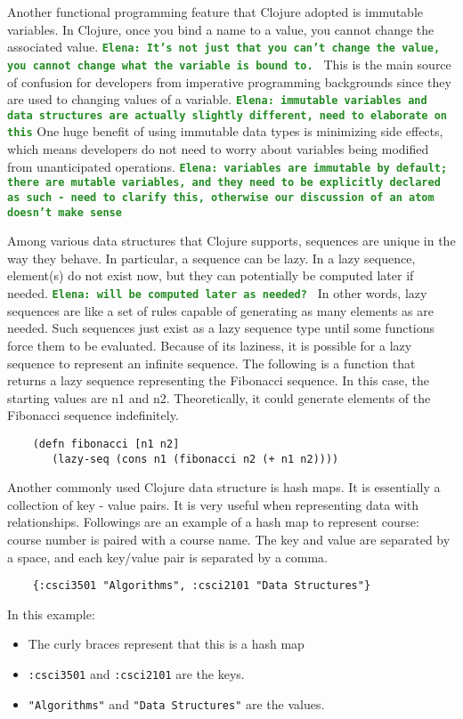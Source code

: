 \documentclass[12pt]{article}
\newcommand{\comment}[1]{{\bf \tt  {#1}}}
\newcommand{\emcomment}[1]{\textcolor{ForestGreen}{\comment{Elena: {#1}}}}
\newcommand{\tscomment}[1]{\textcolor{Teal}{\comment{Tony: {#1}}}}
\begin{document}
	Another functional programming feature that Clojure adopted is immutable variables. In Clojure, once you bind a 
	name to a value, you cannot change the associated value. \emcomment{It's not just that you can't change the value, you cannot change
	what the variable is bound to. }
	This is the main source of confusion for developers from imperative programming backgrounds since they are used to 
	changing values of a variable.
	\emcomment{immutable variables and data structures are actually slightly different, need to elaborate on this} 
	One huge benefit of using immutable data types is minimizing side effects, which means 
	developers do not need to worry about variables being modified from unanticipated operations.
	\emcomment{variables are immutable by default; there are mutable variables, and they need to be explicitly declared as such - need to clarify this, 
	otherwise our discussion of an atom doesn't make sense}
	
		
	
	Among various data structures that Clojure supports, sequences are unique in 
	the way they behave. In particular, a sequence can be lazy. In a lazy sequence, element(s) do not exist now, but they 
	can potentially be computed later if needed. 
	\emcomment{will be computed later as needed? }
	In other words, lazy sequences are like a set of rules capable of generating as many elements as are needed.
	Such sequences just exist as a lazy sequence type until some functions force them to be evaluated. Because of its laziness, it is possible 
	for a lazy sequence to represent an infinite sequence. The following is a function that returns a lazy sequence representing the 
	Fibonacci sequence. In this case, the starting values are n1 and n2. Theoretically, it could generate elements of the Fibonacci 
	sequence indefinitely. 
	\begin{verbatim}
	(defn fibonacci [n1 n2]
	   (lazy-seq (cons n1 (fibonacci n2 (+ n1 n2))))
	\end{verbatim}
	
	Another commonly used Clojure data structure is hash maps. It is essentially a collection of key - value pairs. 
	It is very useful when representing data with relationships. Followings are an example of a hash map to 
	represent course: course number is paired with a course name. The key and value are separated by a space, and each key/value pair is 
	separated by a comma.
	\begin{verbatim}
	{:csci3501 "Algorithms", :csci2101 "Data Structures"}
	\end{verbatim}
	In this example:
	\begin{itemize}
	\item The curly braces represent that this is a hash map
	\item {\tt :csci3501} and {\tt :csci2101} are the keys.
	\item {\tt "Algorithms"} and {\tt  "Data Structures"} are the values.
	\end{itemize}
	
\end{document}
